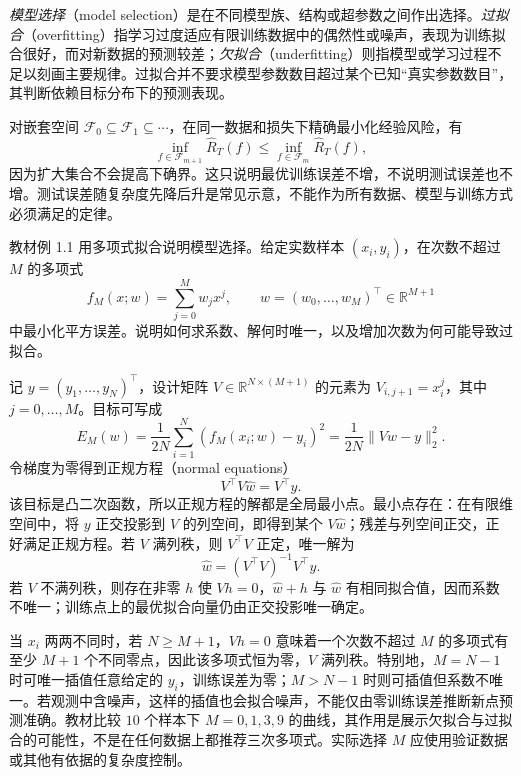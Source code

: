 \emph{模型选择}（model selection）是在不同模型族、结构或超参数之间作出选择。\emph{过拟合}（overfitting）指学习过度适应有限训练数据中的偶然性或噪声，表现为训练拟合很好，而对新数据的预测较差；\emph{欠拟合}（underfitting）则指模型或学习过程不足以刻画主要规律。过拟合并不要求模型参数数目超过某个已知“真实参数数目”，其判断依赖目标分布下的预测表现。

对嵌套空间 $\mathcal F_0\subseteq\mathcal F_1\subseteq\cdots$，在同一数据和损失下精确最小化经验风险，有
\[
    \inf_{f\in\mathcal F_{m+1}}\widehat R_T(f)
       \leq\inf_{f\in\mathcal F_m}\widehat R_T(f),
\]
因为扩大集合不会提高下确界。这只说明最优训练误差不增，不说明测试误差也不增。测试误差随复杂度先降后升是常见示意，不能作为所有数据、模型与训练方式必须满足的定律。

\begin{example}
\label{ex:lh-polynomial-fitting}
教材例 1.1 用多项式拟合说明模型选择。给定实数样本 $(x_i,y_i)$，在次数不超过 $M$ 的多项式
\[
    f_M(x;w)=\sum_{j=0}^M w_jx^j,
    \qquad w=(w_0,\ldots,w_M)^\top\in\mathbb R^{M+1}
\]
中最小化平方误差。说明如何求系数、解何时唯一，以及增加次数为何可能导致过拟合。
\end{example}
\begin{solve}
记 $y=(y_1,\ldots,y_N)^\top$，设计矩阵 $V\in\mathbb R^{N\times(M+1)}$ 的元素为 $V_{i,j+1}=x_i^j$，其中 $j=0,\ldots,M$。目标可写成
\begin{equation}
    E_M(w)=\frac1{2N}\sum_{i=1}^N(f_M(x_i;w)-y_i)^2
      =\frac1{2N}\|Vw-y\|_2^2.
    \label{eq:lh-polynomial-least-squares}
\end{equation}
令梯度为零得到正规方程（normal equations）
\begin{equation}
    V^\top V\widehat w=V^\top y.
    \label{eq:lh-normal-equations}
\end{equation}
该目标是凸二次函数，所以正规方程的解都是全局最小点。最小点存在：在有限维空间中，将 $y$ 正交投影到 $V$ 的列空间，即得到某个 $V\widehat w$；残差与列空间正交，正好满足正规方程。若 $V$ 满列秩，则 $V^\top V$ 正定，唯一解为
\[
    \widehat w=(V^\top V)^{-1}V^\top y.
\]
若 $V$ 不满列秩，则存在非零 $h$ 使 $Vh=0$，$\widehat w+h$ 与 $\widehat w$ 有相同拟合值，因而系数不唯一；训练点上的最优拟合向量仍由正交投影唯一确定。

当 $x_i$ 两两不同时，若 $N\geq M+1$，$Vh=0$ 意味着一个次数不超过 $M$ 的多项式有至少 $M+1$ 个不同零点，因此该多项式恒为零，$V$ 满列秩。特别地，$M=N-1$ 时可唯一插值任意给定的 $y_i$，训练误差为零；$M>N-1$ 时则可插值但系数不唯一。若观测中含噪声，这样的插值也会拟合噪声，不能仅由零训练误差推断新点预测准确。教材比较 $10$ 个样本下 $M=0,1,3,9$ 的曲线，其作用是展示欠拟合与过拟合的可能性，不是在任何数据上都推荐三次多项式。实际选择 $M$ 应使用验证数据或其他有依据的复杂度控制。
\end{solve}

